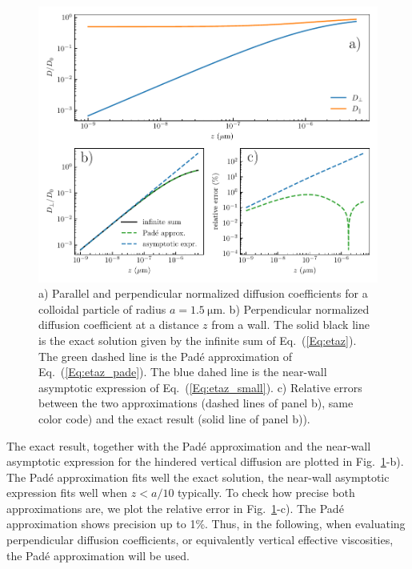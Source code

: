 \begin{figure}[H]
	\centering
	\includegraphics{02_body/chapter3/images/theory_lambda/hindered_diffusion.pdf}
	\caption{a)  Parallel and perpendicular normalized diffusion coefficients for a colloidal particle of radius $a = 1.5 ~ \mathrm{\mu m}$. b) Perpendicular normalized diffusion coefficient at a distance $z$ from a wall. The solid black line is the exact solution given by the infinite sum of Eq.~(\ref{Eq:etaz}). The green dashed line is the Padé approximation of Eq.~(\ref{Eq:etaz_pade}). The blue dahed line is the near-wall asymptotic expression of Eq.~(\ref{Eq:etaz_small}). c) Relative errors between the two approximations (dashed lines of panel b), same color code) and the exact result (solid line of panel b)).\href{https://github.com/eXpensia/Confined-Brownian-Motion/blob/main/02_body/chapter3/images/theory_lambda/Hindered_diffusion.ipynb}{\faGithub}}
	\label{fig.etaz}
\end{figure}


The exact result, together with the Padé approximation and the near-wall asymptotic expression for the hindered vertical diffusion are plotted in Fig.~\ref{fig.etaz}-b). The Padé approximation fits well the exact solution, the near-wall asymptotic expression fits well when $z < a / 10$ typically. To check how precise both approximations are, we plot the relative error in Fig.~\ref{fig.etaz}-c). The Padé approximation shows precision up to 1\%. Thus, in the following, when evaluating perpendicular diffusion coefficients, or equivalently vertical effective viscosities, the Padé approximation will be used. 



